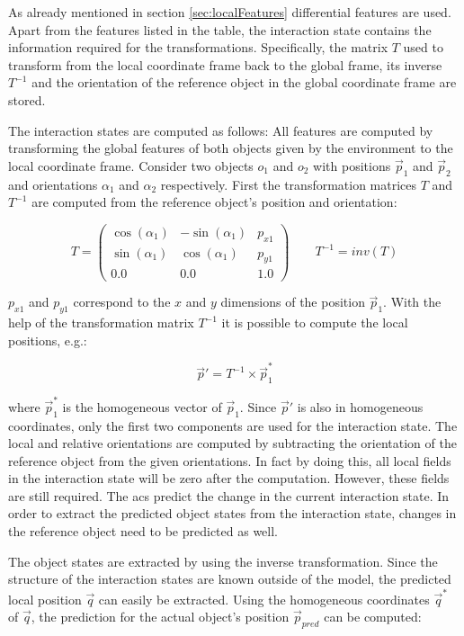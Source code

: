 As already mentioned in section \ref{sec:localFeatures} differential features are used. Apart from the features listed in the table, the interaction state contains the information required for the transformations. Specifically, the matrix $T$ used to transform from the local coordinate frame back to the global frame, its inverse $T^{-1}$ and the orientation of the reference object in the global coordinate frame are stored.

The interaction states are computed as follows:
All features are computed by transforming the global features of both objects given by the environment to the local coordinate frame. Consider two objects $o_1$ and $o_2$ with positions $\vec{p}_1$ and $\vec{p}_2$ and orientations $\alpha_1$ and $\alpha_2$ respectively. First the transformation matrices $T$ and $T^{-1}$ are computed from the reference object's position and orientation:

\begin{equation}
T = \begin{pmatrix}
\cos(\alpha_1) & -\sin(\alpha_1) & p_{x1} \\
\sin(\alpha_1) & \cos(\alpha_1) & p_{y1} \\
0.0 & 0.0 & 1.0
\end{pmatrix}
\qquad
T^{-1} = inv(T)
\label{eq:transMatrix}
\end{equation}

$p_{x1}$ and $p_{y1}$ correspond to the $x$ and $y$ dimensions of the position $\vec{p}_1$. With the help of the transformation matrix $T^{-1}$ it is possible to compute the local positions, e.g.:

\begin{equation}
\vec{p}' = T^{-1} \times \vec{p}_1^*
\end{equation}

where $\vec{p}_1^*$ is the homogeneous vector of $\vec{p}_1$. Since $\vec{p}'$ is also in homogeneous coordinates, only the first two components are used for the interaction state. The local and relative orientations are computed by subtracting the orientation of the reference object from the given orientations. In fact by doing this, all local fields in the interaction state will be zero after the computation. However, these fields are still required. The \glspl{ac} predict the change in the current interaction state. In order to extract the predicted object states from the interaction state, changes in the reference object need to be predicted as well. 

The object states are extracted by using the inverse transformation. Since the structure of the interaction states are known outside of the model, the predicted local position $\vec{q}$ can easily be extracted. Using the homogeneous coordinates $\vec{q}^*$ of $\vec{q}$, the prediction for the actual object's position $\vec{p}_{pred}$ can be computed:

